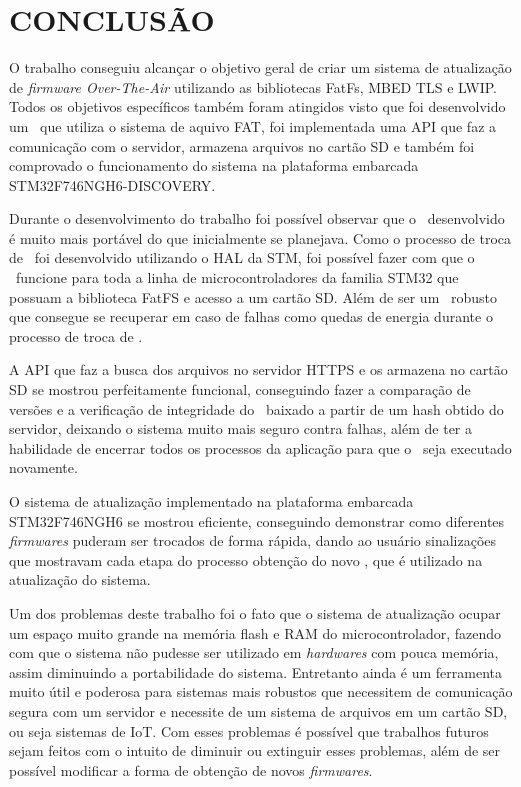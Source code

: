
\chapter{CONCLUSÃO}
\label{chap:conclusao}
O trabalho conseguiu alcançar o objetivo geral de criar um sistema de atualização de \textit{firmware Over-The-Air} utilizando as bibliotecas FatFs, MBED TLS e LWIP. Todos os objetivos específicos também foram atingidos visto que foi desenvolvido um \bootloader\ que utiliza o sistema de aquivo FAT, foi implementada uma API que faz a comunicação com o servidor, armazena arquivos no cartão SD e também foi comprovado o funcionamento do sistema na plataforma embarcada STM32F746NGH6-DISCOVERY.

Durante o desenvolvimento do trabalho foi possível observar que o \bootloader\ desenvolvido é muito mais portável do que inicialmente se planejava. Como o processo de troca de \firmware\ foi desenvolvido utilizando o HAL da STM, foi possível fazer com que o \bootloader\ funcione para toda a linha de microcontroladores da familia STM32 que possuam a biblioteca FatFS e acesso a um cartão SD. Além de ser um \bootloader\ robusto que consegue se recuperar em caso de falhas como quedas de energia durante o processo de troca de \firmware.

A API que faz a busca dos arquivos no servidor HTTPS e os armazena no cartão SD se mostrou perfeitamente funcional, conseguindo fazer a comparação de versões e a verificação de integridade do \firmware\ baixado a partir de um hash obtido do servidor, deixando o sistema muito mais seguro contra falhas, além de ter a habilidade de encerrar todos os processos da aplicação para que o \bootloader\ seja executado novamente.


O sistema de atualização implementado na plataforma embarcada STM32F746NGH6 se mostrou eficiente, conseguindo demonstrar como diferentes \textit{firmwares} puderam ser trocados de forma rápida, dando ao usuário sinalizações que mostravam cada etapa do processo obtenção do novo \firmware, que é utilizado na atualização do sistema.

Um dos problemas deste trabalho foi o fato que o sistema de atualização ocupar um espaço muito grande na memória flash e RAM do microcontrolador, fazendo com que o sistema não pudesse ser utilizado em \textit{hardwares} com pouca memória, assim diminuindo a portabilidade do sistema. Entretanto ainda é um ferramenta muito útil e poderosa para sistemas mais robustos que necessitem de comunicação segura com um servidor e necessite de um sistema de arquivos em um cartão SD, ou seja sistemas de IoT. Com esses problemas é possível que trabalhos futuros sejam feitos com o intuito de diminuir ou extinguir esses problemas, além de ser possível modificar a forma de obtenção de novos \textit{firmwares}.

